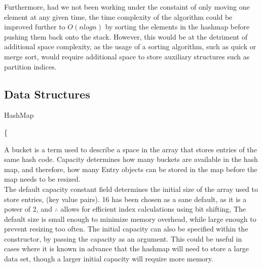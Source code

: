 \documentclass[a4paper]{article}
\begin{document}
Furthermore, had we not been working under the constaint of only moving one element at any given time,
the time complexity of the algorithm could be improved further
to $O(n log n)$ by sorting the elements in the hashmap before pushing them back onto the stack.
However, this would be at the detriment of additional space complexity,
as the usage of a sorting algorithm, such as quick or merge sort, 
would require additional space to store auxiliary structures such as partition indices. \\ 



\subsection{Data Structures} 
\vspace{4mm}


\makeatletter
\renewcommand{\ALG@name}{Structure}
\makeatother
\setcounter{algorithm}{0}

\begin{algorithm}
\caption{HashMap}\label{euclid}
\begin{algorithmic}[1]



\algrenewcommand{}
 {\{} \\
\EndProcedure
\end{algorithmic}
\end{algorithm}

A bucket is a term used to describe a space in the array that stores entries of the same hash code.
Capacity determines how many buckets are available in the hash map, and therefore,
how many Entry objects can be stored in the map before the map needs to be resized. \\

The default capacity constant field determines the initial size of the array
used to store entries, (key value pairs). 16 has been chosen as a sane default,
as it is a power of 2, and $\therefore$ allows for efficient index calculations using bit shifting,
The default size is small enough to minimize memory overhead,
while large enough to prevent resizing too often.
The initial capacity can also be specified within the constructor, 
by passing the capacity as an argument. 
This could be useful in cases where it is known in advance that the hashmap will need 
to store a large data set, though a larger initial capacity will require more memory. \\
\end{document}
